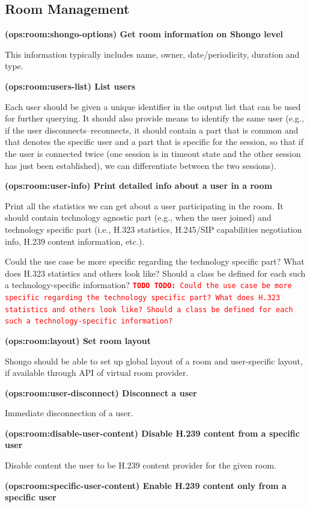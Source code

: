 \documentclass[a4paper]{report}
\makeatletter
\newcounter{UCcounter}
\newenvironment{UseCases}%
	{\begin{list}{\textbf{UC-\arabic{UCcounter}}}{\@nmbrlisttrue\def\@listctr{UCcounter}}}%
	{\end{list}}
\newcommand{\UClabel}[1]{\label{UC:#1}}
\newcommand{\UseCase}[2]{\item\UClabel{#2} \textbf{(#2) #1}\\ \nopagebreak}
\newcommand{\TODO}[1]{%
\def\empty{}%
\def\prvniparametr{#1}%
\ifx\prvniparametr\empty%
\begingroup\tt\textcolor{red}{\noindent\textbf{TODO}}\endgroup
\else%
\begingroup\tt\textcolor{red}{\noindent\textbf{TODO:}\ #1}\endgroup
\fi%
}
\makeatother
\begin{document}
\subsection{Room Management}

\begin{UseCases}

\UseCase{Get room information on Shongo level}{ops:room:shongo-options}

This information typically includes name, owner, date/periodicity, duration and type.


\UseCase{List users}{ops:room:users-list}

Each user should be given a unique identifier in the output list that can be
used for further querying. It should also provide means to identify the same
user (e.g., if the user disconnects--reconnects, it should contain a part that
is common and that denotes the specific user and a part that is specific for
the session, so that if the user is connected twice (one session is in timeout
state and the other session has just been established), we can differentiate
between the two sessions).

\UseCase{Print detailed info about a user in a room}{ops:room:user-info}

Print all the statistics we can get about a user participating in the room. It
should contain technology agnostic part (e.g., when the user joined) and
technology specific part (i.e., H.323 statistics, H.245/SIP capabilities
negotiation info, H.239 content information, etc.).

\TODO{Could the use case be more specific regarding the technology specific part? What does H.323 statistics and others look like? Should a class be defined for each such a technology-specific information?}

\UseCase{Set room layout}{ops:room:layout}

Shongo should be able to set up global layout of a room and user-specific
layout, if available through API of virtual room provider.

\UseCase{Disconnect a user}{ops:room:user-disconnect}

Immediate disconnection of a user.

\UseCase{Disable H.239 content from a specific user}{ops:room:disable-user-content}

Disable content the user to be H.239 content provider for the given room.

\UseCase{Enable H.239 content only from a specific user}{ops:room:specific-user-content}


\end{UseCases}
\end{document}
